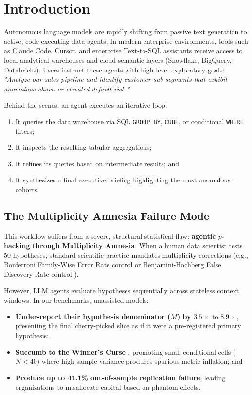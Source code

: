 \documentclass[11pt,a4paper]{article}
\begin{document}
\section{Introduction}
Autonomous language models are rapidly shifting from passive text generation to active, code-executing data agents. In modern enterprise environments, tools such as Claude Code, Cursor, and enterprise Text-to-SQL assistants receive access to local analytical warehouses and cloud semantic layers (Snowflake, BigQuery, Databricks). Users instruct these agents with high-level exploratory goals: \textit{"Analyze our sales pipeline and identify customer sub-segments that exhibit anomalous churn or elevated default risk."}

Behind the scenes, an agent executes an iterative loop:
\begin{enumerate}
    \item It queries the data warehouse via SQL \texttt{GROUP BY}, \texttt{CUBE}, or conditional \texttt{WHERE} filters;
    \item It inspects the resulting tabular aggregations;
    \item It refines its queries based on intermediate results; and
    \item It synthesizes a final executive briefing highlighting the most anomalous cohorts.
\end{enumerate}

\subsection{The Multiplicity Amnesia Failure Mode}
This workflow suffers from a severe, structural statistical flaw: \textbf{agentic $p$-hacking through Multiplicity Amnesia}. When a human data scientist tests 50 hypotheses, standard scientific practice mandates multiplicity corrections (e.g., Bonferroni Family-Wise Error Rate control \cite{bonferroni1936} or Benjamini-Hochberg False Discovery Rate control \cite{benjamini1995}). 

However, LLM agents evaluate hypotheses sequentially across stateless context windows. In our benchmarks, unassisted models:
\begin{itemize}
    \item \textbf{Under-report their hypothesis denominator ($M$) by $3.5\times\text{ to }8.9\times$}, presenting the final cherry-picked slice as if it were a pre-registered primary hypothesis;
    \item \textbf{Succumb to the Winner's Curse \cite{ioannidis2005}}, promoting small conditional cells ($N < 40$) where high sample variance produces spurious metric inflation; and
    \item \textbf{Produce up to 41.1\% out-of-sample replication failure}, leading organizations to misallocate capital based on phantom effects.
\end{itemize}
\end{document}
